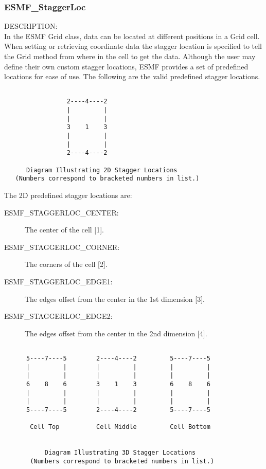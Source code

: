 \subsubsection{ESMF\_StaggerLoc}\label{sec:opt:staggerloc}

 {\sf DESCRIPTION:\\}
 In the ESMF Grid class, data can be located at different positions in a
 Grid cell.  When setting or retrieving coordinate data the stagger location is
 specified to tell the Grid method  from where in the cell to get the data. 
 Although the user may define their own custom stagger locations, 
 ESMF provides a set of predefined locations for ease of use. The
following are the valid predefined stagger locations. 

\medskip

\begin{verbatim}
    
                 2----4----2
                 |         |
                 |         |
                 3    1    3
                 |         |
                 |         |
                 2----4----2
 
      Diagram Illustrating 2D Stagger Locations
   (Numbers correspond to bracketed numbers in list.)

\end{verbatim}

The 2D predefined stagger locations are:\\
\begin{description}
\item [ESMF\_STAGGERLOC\_CENTER:] The center of the cell [1].
\item [ESMF\_STAGGERLOC\_CORNER:] The corners of the cell [2].
\item [ESMF\_STAGGERLOC\_EDGE1:] The edges offset from the center in the 1st dimension [3].
\item [ESMF\_STAGGERLOC\_EDGE2:] The edges offset from the center in the 2nd dimension [4].
\end{description}

\medskip

\begin{verbatim}
    
      5----7----5        2----4----2         5----7----5
      |         |        |         |         |         |
      |         |        |         |         |         | 
      6    8    6        3    1    3         6    8    6
      |         |        |         |         |         |
      |         |        |         |         |         |
      5----7----5        2----4----2         5----7----5

       Cell Top          Cell Middle         Cell Bottom
         

           Diagram Illustrating 3D Stagger Locations
       (Numbers correspond to bracketed numbers in list.)

\end{verbatim}

